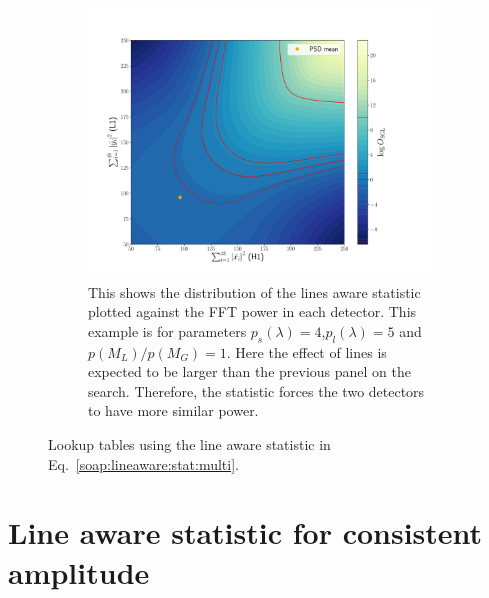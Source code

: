 \begin{figure}
\begin{subfigure}[h]{\linewidth}
\begin{minipage}{0.65\linewidth}
\includegraphics[width=1.\columnwidth]{C3_soap/lookup_linebig.pdf}
\end{minipage}\hfill
\begin{minipage}{0.35\linewidth}
\caption{This shows the distribution of the lines aware statistic plotted against the \gls{FFT} power in each detector. This example is for parameters $p_s(\lambda) = 4$,$p_l(\lambda) = 5$ and $p(M_L)/p(M_G) = 1$. Here the effect of lines is expected to be larger than the previous panel on the search. Therefore, the statistic forces the two detectors to have more similar power.}
\label{soap:las:detp:linebig}
\end{minipage}
\end{subfigure}
\caption[Lookup table for line aware statistic.]{Lookup tables using the line aware statistic in Eq.~\ref{soap:lineaware:stat:multi}.}
\label{soap:las:osgl_plots}
\end{figure}


\section{\label{soap:lineawareamp}Line aware statistic for consistent amplitude}


